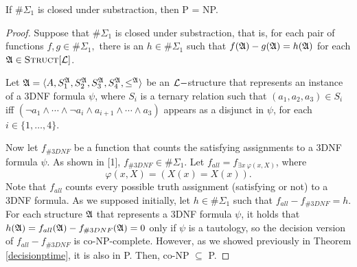 \begin{theo}
If $\#\Sigma_1$ is closed under substraction, then {\sc P} = {\sc NP}.
\end{theo}
\begin{proof}
Suppose that $\#\Sigma_1$ is closed under substraction, that is, for each pair of functions $f,g\in\#\Sigma_1,$ there is an $h\in\#\Sigma_1$ such that $f({\frak A})-g({\frak A}) = h({\frak A})$ for each ${\frak A}\in\textsc{Struct}[{\cal L}]$.

Let ${\frak A} = \langle A, S_1^{\frak A}, S_2^{\frak A}, S_3^{\frak A}, S_4^{\frak A}, \leq^{\frak A} \rangle$ be an ${\cal L}-$structure that represents an instance of a 3DNF formula $\psi$, where $S_i$ is a ternary relation such that $(a_1,a_2,a_3) \in S_i$ iff $(\neg a_1 \wedge \cdots \wedge\neg a_i \wedge a_{i+1} \wedge \cdots \wedge a_3)$ appears as a disjunct in $\psi$, for each $i\in\{1,\ldots,4\}$.

Now let $f_{\#3DNF}$ be a function that counts the satisfying assignments to a 3DNF formula $\psi$. As shown in [1], $f_{\#3DNF} \in \#\Sigma_1$. Let $f_{all} = f_{\exists x\:\varphi(x,X)}$, where
$$
\varphi(x,X) = (X(x) = X(x)).
$$
Note that $f_{all}$ counts every possible truth assignment (satisfying or not) to a 3DNF formula. As we supposed initially, let $h\in\#\Sigma_1$ such that $f_{all}-f_{\#3DNF} = h$. For each structure ${\frak A}$ that represents a 3DNF formula $\psi$, it holds that $h({\frak A}) = f_{all}({\frak A})-f_{\#3DNF}({\frak A}) = 0$ only if $\psi$ is a tautology, so the decision version of $f_{all}-f_{\#3DNF}$ is co-NP-complete. However, as we showed previously in Theorem \ref{decisionptime}, it is also in P. Then, co-NP $\subseteq$ P.
\end{proof}